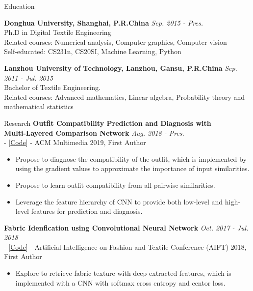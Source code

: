 \documentclass{resume} %
\begin{document}

\begin{rSection}{Education}

{\bf Donghua University, Shanghai, P.R.China} \hfill {\em Sep. 2015 - Pres.} 
\\ Ph.D in Digital Textile Engineering
\\ Related courses: Numerical analysis, Computer graphics, Computer vision
\\ Self-educated: CS231n, CS20SI, Machine Learning, Python

{\bf Lanzhou University of Technology, Lanzhou, Gansu, P.R.China} \hfill {\em Sep. 2011 - Jul. 2015} 
\\ Bachelor of Textile Engineering.
\\ Related courses: Advanced mathematics, Linear algebra, Probability theory and mathematical statistics


\end{rSection}
\begin{rSection}{Research}
{\bf Outfit Compatibility Prediction and Diagnosis with \\ Multi-Layered Comparison Network} \hfill {\em Aug. 2018 - Pres.}
\\ - [\href{https://github.com/WangXin93/fashion_compatibility_mcn}{Code}] - ACM Multimedia 2019, First Author
\begin{itemize}
    \item Propose to diagnose the compatibility of the outfit, which is implemented by using the gradient values to approximate the importance of input similarities.
    \item Propose to learn outfit compatibility from all pairwise similarities.
    \item Leverage the feature hierarchy of CNN to provide both low-level and high-level features for prediction and diagnosis.
\end{itemize}

{\bf Fabric Idenfication using Convolutional Neural Network} \hfill {\em Oct. 2017 - Jul. 2018}
\\ - [\href{https://github.com/WangXin93/FabricID}{Code}] - Artificial Intelligence on Fashion and Textile Conference (AIFT) 2018, First Author
\begin{itemize}
    \item Explore to retrieve fabric texture with deep extracted features, which is implemented with a CNN with softmax cross entropy and centor loss.
\end{itemize}

\end{rSection}
\end{document}
